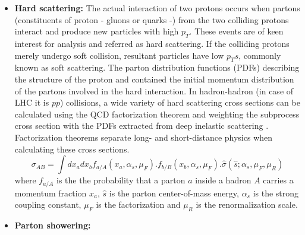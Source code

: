 \begin{itemize}
\item{\textbf{Hard scattering:}}
The actual interaction of two protons occurs when partons (constituents of proton - gluons or quarks -) from the two colliding protons interact and produce new particles with high $p_{T}$. These events are of keen interest for analysis and referred as hard scattering. If the colliding protons merely undergo soft collision, resultant particles have low $p_{T}s$, commonly known as soft scattering. The parton distribution functions (PDFs) describing the structure of the proton and contained the initial momentum distribution of the partons involved in the hard interaction. In hadron-hadron (in case of LHC it is $pp$) collisions, a wide variety of hard scattering cross sections can be calculated using the QCD factorization theorem and weighting the subprocess cross section with the PDFs extracted from deep inelastic scattering \cite{hard_scatter}. Factorization theorems separate long- and short-distance physics when calculating these cross sections.   
\begin{equation}\label{eq:xsec}
\sigma_{AB} = \int dx_{a}dx_{b}f_{a/A}(x_{a},\alpha_{s},\mu_{F}).f_{b/B}(x_{b},\alpha_{s},\mu_{F}).\hat{\sigma}(\hat{s};\alpha_{s},\mu_{F},\mu_{R})
\end{equation}  
where $f_{a/A}$ is the the probability that a parton $a$ inside a hadron $A$ carries a momentum fraction $x_{a}$, $\hat{s}$ is the parton center-of-mass energy, $\alpha_{s}$ is the strong coupling constant, $\mu_{F}$ is the factorization and $\mu_{R}$ is the renormalization scale.
\item{\textbf{Parton showering:}}

\end{itemize}
